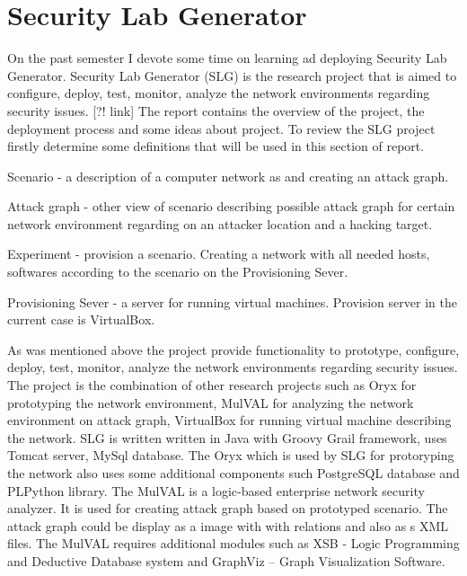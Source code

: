 %


\section{Security Lab Generator}
On the past semester I devote some time on learning ad deploying Security Lab Generator.
Security Lab Generator (SLG) is the research project that is aimed to configure, deploy, test, monitor, analyze the network environments regarding security issues. [?! link] The report contains the overview of the project, the deployment process and some ideas about project.
To review the SLG project firstly determine some definitions that will be used in this section of report.

\begin{compactitem}
\item Scenario - a description of a computer network as and creating an attack graph. 
\item Attack graph - other view of scenario describing possible attack graph for certain network environment regarding on an attacker location and a hacking target.   
\item Experiment - provision a scenario. Creating a network with all needed hosts, softwares according to the scenario on the Provisioning Sever.
\item Provisioning Sever - a server for running virtual machines. Provision server in the current case is VirtualBox.
\end{compactitem}

As was mentioned above the project provide functionality to prototype, configure, deploy, test, monitor, analyze the network environments regarding security issues. The project is the combination of other research projects such as Oryx for prototyping the network environment, MulVAL for analyzing the network environment on attack graph, VirtualBox for running virtual machine describing the network. SLG is written written in Java with Groovy Grail framework, uses Tomcat server, MySql database. The Oryx which is used by SLG for protoryping the network also uses some additional components such PostgreSQL database and PLPython library. The MulVAL is a logic-based enterprise network security analyzer. It is used for creating attack graph based on prototyped scenario. The attack graph could be display as a image with with relations and also as s XML files. The MulVAL requires additional modules such as XSB - Logic Programming and Deductive Database system and GraphViz – Graph Visualization Software.

